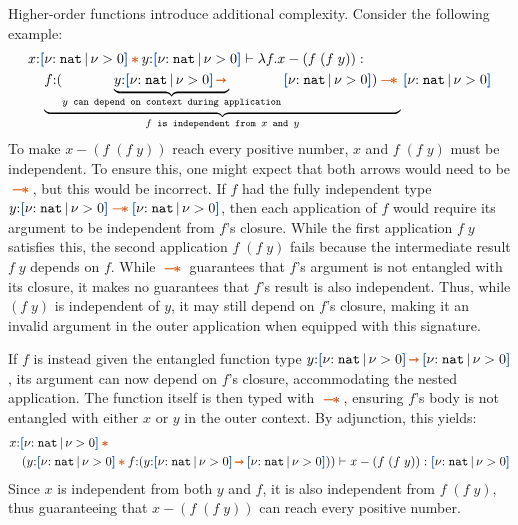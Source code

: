 Higher-order functions introduce additional complexity. Consider the
following example:
\vspace{-0.2em}
\begin{align*}
  &x{:}\urt{\Nat}{\vnu > 0} \ctstar y{:}\urt{\Nat}{\vnu > 0} \vdash \zzlam{f}{x - (f\; (f\;y))} :
  \\&\quad  \underbrace{f{:}(\underbrace{y{:}\urt{\Nat}{\vnu > 0} \ctsarr}_\texttt{$y$ can depend on context during application} \urt{\Nat}{\vnu > 0}) \ctwand}_\texttt{$f$ is independent from $x$ and $y$} \urt{\Nat}{\vnu > 0}
\end{align*}\noindent
{}  To make
$x - (f\;(f\;y))$ reach every positive number, $x$ and $f\;(f\;y)$
must be independent. To ensure this, one might expect that both arrows
would need to be $\ctwand$, but this would be incorrect. If $f$ had
the fully independent type
$y{:}\urt{\Nat}{\vnu > 0} \ctwand \urt{\Nat}{\vnu > 0}$, then each
application of $f$ would require its argument to be independent from
$f$'s closure. While the first application $f\;y$ satisfies this, the
second application $f\;(f\;y)$ fails because the intermediate result
$f\;y$ depends on $f$. While $\ctwand$ guarantees that $f$'s argument
is not entangled with its closure, it makes no guarantees that $f$'s
result is also independent. Thus, while $(f\; y)$ is independent of
$y$, it may still depend on $f$'s closure, making it an invalid
argument in the outer application when equipped with this signature.

If $f$ is instead given the entangled function type
$y{:}\urt{\Nat}{\vnu > 0} \ctsarr \urt{\Nat}{\vnu > 0}$, its argument
can now depend on $f$'s closure, accommodating the nested
application. The function itself is then typed with $\ctwand$,
ensuring $f$'s body is not entangled with either $x$ or $y$ in the
outer context. By adjunction, this yields:
\vspace{-0.2em}
\begin{align*}
  &x{:}\urt{\Nat}{\vnu > 0} \ctstar
  \\&\quad (y{:}\urt{\Nat}{\vnu > 0} \ctstar
  f{:}(y{:}\urt{\Nat}{\vnu > 0} \ctsarr \urt{\Nat}{\vnu > 0}))
  \vdash x - (f\; (f\;y)) : \urt{\Nat}{\vnu > 0}
\end{align*}\noindent
Since $x$ is independent from both $y$ and $f$, it is also independent
from $f\;(f\;y)$, thus guaranteeing that $x - (f\;(f\;y))$ can reach
every positive number.

